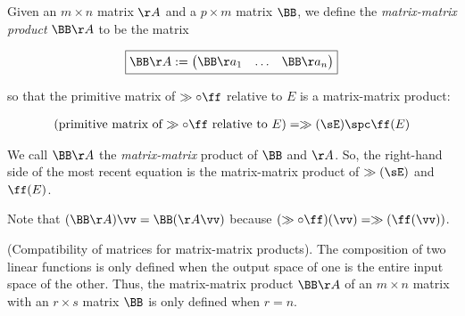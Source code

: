 \begin{defn}
    Given an $m \times n$ matrix $\AA$ and a
    $p \times m$ matrix $\BB$, we define the \textit{matrix-matrix product} $\BB \AA$ to be the matrix
    
    \begin{align*}
        \boxed
        {
            \BB \AA := \begin{pmatrix} \BB \aa_1 & \hdots & \BB \aa_n \end{pmatrix}
        }
    \end{align*}
    
    so that the primitive matrix of $\gg \circ \ff$ relative to $E$ is a matrix-matrix product:
    
    \begin{align*}
        (\text{primitive matrix of $\gg \circ \ff$ relative to $E$}) = \gg(\sE) \spc \ff(E)
    \end{align*}
    
    We call $\BB \AA$ the \textit{matrix-matrix} product of $\BB$ and $\AA$. So, the right-hand side of the most recent equation is the matrix-matrix product of $\gg(\sE)$ and $\ff(E)$.
    
    Note that $(\BB \AA) \vv = \BB (\AA \vv)$ because $(\gg \circ \ff)(\vv) = \gg(\ff(\vv))$.
\end{defn}

\begin{remark}
    (Compatibility of matrices for matrix-matrix products). The composition of two linear functions is only defined when the output space of one is the entire input space of the other. Thus, the matrix-matrix product $\BB \AA$ of an $m \times n$ matrix with an $r \times s$ matrix $\BB$ is only defined when $r = n$.
\end{remark}

